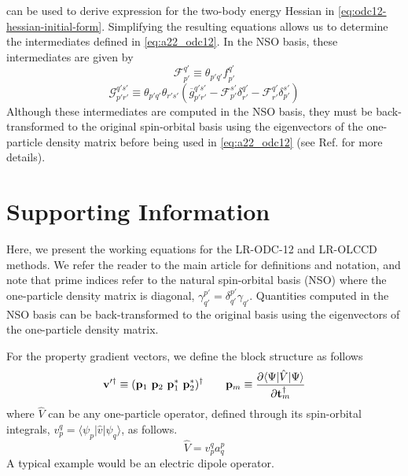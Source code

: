 \begin{subappendices}
     can be used to
    derive expression for the two-body energy Hessian in
    \cref{eq:odc12-hessian-initial-form}.
    Simplifying the resulting equations allows us to determine the intermediates
    defined in \cref{eq:a22_odc12}.
    In the NSO basis, these intermediates are given by
    \begin{equation}
        \label{eq:fancy-f-intermediate}
        \mathcal{F}_{p'}^{q'}
        \equiv
        \theta_{p'q'}
        f_{p'}^{q'}
    \end{equation}
    \begin{equation}
        \label{eq:fancy-g-intermediate}
        \mathcal{G}_{p'r'}^{q's'}
        \equiv
        \theta_{p'q'}
        \theta_{r's'}
        (
            \overline{g}_{p'r'}^{q's'}
            -
            \mathcal{F}_{p'}^{s'}
            \delta_{r'}^{q'}
            -
            \mathcal{F}_{r'}^{q'}
            \delta_{p'}^{s'}
        )
    \end{equation}
    Although these intermediates are computed in the NSO basis, they must be
    back-transformed to the original spin-orbital basis using the eigenvectors
    of the one-particle density matrix before being used in \cref{eq:a22_odc12}
    (see Ref.\@ {} for more details).


    \section{Supporting Information}
    \label{sec:suppinfo}

    Here, we present the working equations for the LR-ODC-12 and LR-OLCCD
    methods.
    We refer the reader to the main article for definitions and notation, and
    note that prime indices refer to the natural spin-orbital basis (NSO) where
    the one-particle density matrix is diagonal,
    \(\gamma^{p'}_{q'}=\delta^{p'}_{q'}\gamma_{q'}\).
    Quantities computed in the NSO basis can be back-transformed to the original
    basis using the eigenvectors of the one-particle density matrix.

    For the property gradient vectors, we define the block structure as follows
    \begin{equation}
        \mathbf{v}'^\dagger
        \equiv
        (\mathbf{p}_1\ \mathbf{p}_2\ \mathbf{p}_1^*\ \mathbf{p}_2^*)^\dagger
        \qquad
        \mathbf{p}_m
        \equiv
        \frac{%
            \partial \langle\Psi|\hat{V}|\Psi\rangle
        }{%
            \partial \mathbf{t}_m^\dagger
        }
    \end{equation}
    where \(\hat{V}\) can be any one-particle operator, defined through its
    spin-orbital integrals, \(v_p^q=\langle\psi_p|\hat{v}|\psi_q\rangle\), as
    follows.
    \begin{equation}
        \hat{V}
        =
        v_p^q
        a^p_q
    \end{equation}
    A typical example would be an electric dipole operator.


\end{subappendices}
